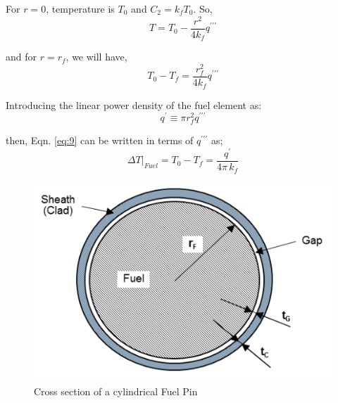 \documentclass[12pt]{article}
\begin{document}
\begin{multicols}{2}
For $r=0$, temperature is $T_0$ and $C_2 = k_f T_0$. So,
\begin{equation}\label{eq:9}
    T = T_0 - \frac{r^2}{4k_f} q^{\prime \prime \prime}
\end{equation}

and for $r=r_f$, we will have,
\begin{equation}\label{eq:10}
    T_0 - T_f = \frac{r_f^2}{4k_f} q^{\prime \prime \prime}
\end{equation}

Introducing the linear power density of the fuel element as:
\begin{equation}\label{eq:11}
    q^{\prime} \equiv \pi r_f^2 q^{\prime \prime \prime}
\end{equation}

then, Eqn. \ref{eq:9} can be written in terms of $q^{\prime \prime \prime}$ as;
\begin{equation}\label{eq:12}
    \Delta T\Big|_{F u e l}=T_{0}-T_{f}=\frac{q^{'}}{4\pi\,k_{f}}
\end{equation}

\end{multicols}

\begin{figure}
    \centering
    \includegraphics[width=0.7\linewidth]{figs/cylindrical fuel pin diagram.png}
    \caption{Cross section of a cylindrical Fuel Pin \cite{popov2017th}}
    \label{fig:fig_2}
\end{figure}
\end{document}
